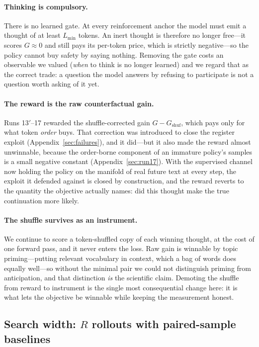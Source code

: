 \documentclass{article} %
\newcommand{\gain}{G}
\begin{document}
\paragraph{Thinking is compulsory.} There is no learned gate. At every reinforcement anchor the model must emit a thought of at least $L_{\min}$ tokens. An inert thought is therefore no longer free---it scores $\gain \approx 0$ and still pays its per-token price, which is strictly negative---so the policy cannot buy safety by saying nothing. Removing the gate costs an observable we valued (\emph{when} to think is no longer learned) and we regard that as the correct trade: a question the model answers by refusing to participate is not a question worth asking of it yet.

\paragraph{The reward is the raw counterfactual gain.} Runs 13$'$--17 rewarded the shuffle-corrected gain $\gain - \gain_{\mathrm{shuf}}$, which pays only for what token \emph{order} buys. That correction was introduced to close the register exploit (Appendix~\ref{sec:failures}), and it did---but it also made the reward almost unwinnable, because the order-borne component of an immature policy's samples is a small negative constant (Appendix~\ref{sec:run17}). With the supervised channel now holding the policy on the manifold of real future text at every step, the exploit it defended against is closed by construction, and the reward reverts to the quantity the objective actually names: did this thought make the true continuation more likely.

\paragraph{The shuffle survives as an instrument.} We continue to score a token-shuffled copy of each winning thought, at the cost of one forward pass, and it never enters the loss. Raw gain is winnable by topic priming---putting relevant vocabulary in context, which a bag of words does equally well---so without the minimal pair we could not distinguish priming from anticipation, and that distinction \emph{is} the scientific claim. Demoting the shuffle from reward to instrument is the single most consequential change here: it is what lets the objective be winnable while keeping the measurement honest.

\subsection{Search width: $R$ rollouts with paired-sample baselines}
\label{sec:rollouts}
\end{document}
